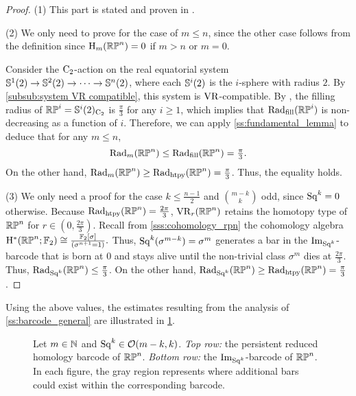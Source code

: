 \begin{proof}
	(1) This part is stated and proven in \cite[Thm.~4.5]{adams2022metric}.

	(2) We only need to prove for the case of $m\leq n$, since the other case follows from the definition since \(\mathrm{H}_m(\mathbb{RP}^n) = 0\) if \(m > n\) or \(m = 0\).

    Consider the \(\mathrm{C}_2\)-action on the real equatorial system \(\mathbb{S}^{1}(2) \to \mathbb{S}^{2}(2) \to \dotsb \to \mathbb{S}^{n}(2)\), where each $\mathbb{S}^{i}(2)$ is the $i$-sphere with radius $2$.
    By \cref{subsub:system VR compatible}, this system is \(\mathrm{VR}\)-compatible.
    By \cite{katz1983filling}, the filling radius of $\mathbb{RP}^i = \mathbb{S}^{i}(2)_{\mathrm{C}_2}$ is $\frac{\pi}{3}$ for any $i \geq 1$, which implies that $\mathrm{Rad}_{\mathrm{fill}}(\mathbb{RP}^i)$ is non-decreasing as a function of \(i\).
    Therefore, we can apply \cref{ss:fundamental_lemma} to deduce that for any \(m \leq n\),
    \[
    \mathrm{Rad}_{m}(\mathbb{RP}^n) \leq \mathrm{Rad}_{\mathrm{fill}}(\mathbb{RP}^n) = \tfrac{\pi}{3}.
    \]
	On the other hand, $\mathrm{Rad}_{m}(\mathbb{RP}^n)\geq \mathrm{Rad}_{\mathrm{htpy}}(\mathbb{RP}^n) = \tfrac{\pi}{3}$.
    Thus, the equality holds.

	(3) We only need a proof for the case $k \leq \frac{n-1}{2}$ and $\binom{m-k}{k}$ odd, since \(\mathrm{Sq}^k = 0\) otherwise.
	Because $\mathrm{Rad}_{\mathrm{htpy}}(\mathbb{RP}^n)=\frac{2\pi}{3}$, $\mathrm{VR}_r(\mathbb{RP}^n)$ retains the homotopy type of $\mathbb{RP}^n$ for $r \in (0,\tfrac{2\pi}{3})$.
    Recall from \cref{sss:cohomology_rpn} the cohomology algebra \(\mathrm{H}^\ast(\mathbb{RP}^n; {\mathbb{F}_2}) \cong \frac{{\mathbb{F}_2}[\sigma]}{(\sigma^{n+1} = 1)}.\)
    Thus, $\mathrm{Sq}^k(\sigma^{m-k}) = \sigma^{m}$ generates a bar in the $\operatorname{Im}_{\mathrm{Sq}^k}$-barcode that is born at $0$ and stays alive until the non-trivial class $\sigma^{m}$ dies at $\tfrac{2\pi}{3}$.
	Thus, $\mathrm{Rad}_{\mathrm{Sq}^k}(\mathbb{RP}^n) \leq \tfrac{\pi}{3}$.
	On the other hand, $\mathrm{Rad}_{\mathrm{Sq}^k}(\mathbb{RP}^n) \geq \mathrm{Rad}_{\mathrm{htpy}}(\mathbb{RP}^n) = \tfrac{\pi}{3}$.
\end{proof}

Using the above values, the estimates resulting from the analysis of \cref{ss:barcode_general} are illustrated in \cref{fig:sq barcodes}.

\begin{figure}
	\centering
	
	\caption{Let $m \in \mathbb{N}$ and $\mathrm{Sq}^k \in \mathcal{O}(m-k, k)$.
        \emph{Top row:} the persistent reduced homology barcode of $\mathbb{RP}^n$.
		\emph{Bottom row:} the $\operatorname{Im}_{\mathrm{Sq}^k}$-barcode of $\mathbb{RP}^n$.
        In each figure, the gray region represents where additional bars could exist within the corresponding barcode.
	}
	\label{fig:sq barcodes}
\end{figure}


